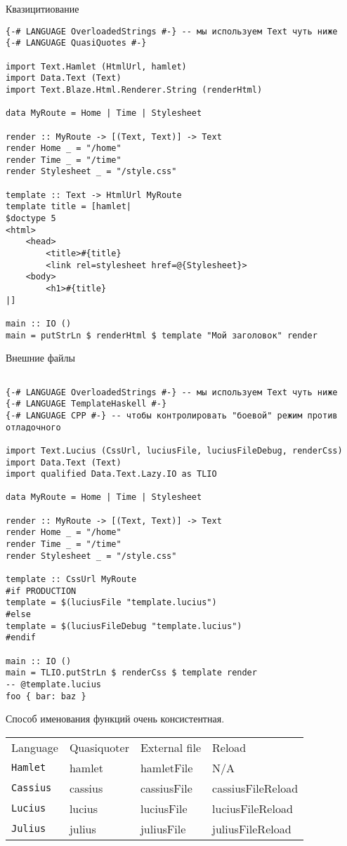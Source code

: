 Квазицитиование
\begin{lstlisting}
{-# LANGUAGE OverloadedStrings #-} -- мы используем Text чуть ниже
{-# LANGUAGE QuasiQuotes #-}

import Text.Hamlet (HtmlUrl, hamlet)
import Data.Text (Text)
import Text.Blaze.Html.Renderer.String (renderHtml)

data MyRoute = Home | Time | Stylesheet

render :: MyRoute -> [(Text, Text)] -> Text
render Home _ = "/home"
render Time _ = "/time"
render Stylesheet _ = "/style.css"

template :: Text -> HtmlUrl MyRoute
template title = [hamlet|
$doctype 5
<html>
    <head>
        <title>#{title}
        <link rel=stylesheet href=@{Stylesheet}>
    <body>
        <h1>#{title}
|]

main :: IO ()
main = putStrLn $ renderHtml $ template "Мой заголовок" render
\end{lstlisting}

Внешние файлы
\begin{lstlisting}

{-# LANGUAGE OverloadedStrings #-} -- мы используем Text чуть ниже
{-# LANGUAGE TemplateHaskell #-}
{-# LANGUAGE CPP #-} -- чтобы контролировать "боевой" режим против отладочного

import Text.Lucius (CssUrl, luciusFile, luciusFileDebug, renderCss)
import Data.Text (Text)
import qualified Data.Text.Lazy.IO as TLIO

data MyRoute = Home | Time | Stylesheet

render :: MyRoute -> [(Text, Text)] -> Text
render Home _ = "/home"
render Time _ = "/time"
render Stylesheet _ = "/style.css"

template :: CssUrl MyRoute
#if PRODUCTION
template = $(luciusFile "template.lucius")
#else
template = $(luciusFileDebug "template.lucius")
#endif

main :: IO ()
main = TLIO.putStrLn $ renderCss $ template render
-- @template.lucius
foo { bar: baz }
\end{lstlisting}

Способ именования функций очень консистентная.
\begin{tabular}{l l l l}
Language & Quasiquoter & External file & Reload \\
\texttt{Hamlet}   & hamlet      & hamletFile    & N/A    \\
\texttt{Cassius}  & cassius     & cassiusFile   & cassiusFileReload \\
\texttt{Lucius}   & lucius      & luciusFile    & luciusFileReload \\
\texttt{Julius}   & julius      & juliusFile    & juliusFileReload \\
\end{tabular}

